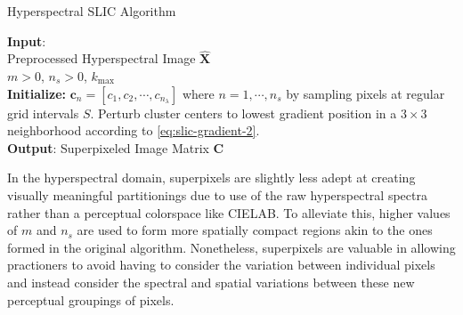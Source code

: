 \begin{algorithm}[H]
    \label{HSI SLIC}
    \caption{Hyperspectral SLIC Algorithm}
    \textbf{Input}:\\
    \quad  Preprocessed Hyperspectral Image $\hat{\mathbf{X}}$\\
    \quad $m > 0$, $n_s > 0$, $k_{\text{max}}$\\

    \textbf{Initialize:} $\mathbf{c}_n = [c_1, c_2, \cdots, c_{n_\lambda}]$ where $n = 1, \cdots, n_s$ by sampling pixels at regular grid intervals $S$. Perturb cluster centers to lowest gradient position in a $3 \times 3$ neighborhood according to \eqref{eq:slic-gradient-2}. \\
    
    \textbf{Output}: Superpixeled Image Matrix $\mathbf{C}$
\end{algorithm}


In the hyperspectral domain, superpixels are slightly less adept at creating visually meaningful partitionings due to use of the raw hyperspectral spectra rather than a perceptual colorspace like CIELAB. To alleviate this, higher values of $m$ and $n_s$ are used to form more spatially compact regions akin to the ones formed in the original algorithm. Nonetheless, superpixels are valuable in allowing practioners to avoid having to consider the variation between individual pixels and instead consider the spectral and spatial variations between these new perceptual groupings of pixels. 